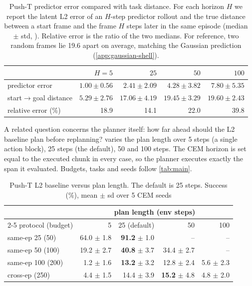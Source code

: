 \documentclass{article} %
\begin{document}
\begin{table}[h]
\centering\small
\caption{Push-T predictor error compared with task distance. For each horizon $H$ we report
the latent L2 error of an $H$-step predictor rollout and the true distance between a start frame
and the frame $H$ steps later in the same episode (median $\pm$ std, ). Relative error is the ratio of the two medians. For reference, two
random frames lie 19.6 apart on average, matching the Gaussian prediction
 (\cref{app:gaussian-shell}).}
\label{tab:predictor-error-and-task-distance}
\begin{tabular}{lrrrr}
\toprule
& $H=5$ & $25$ & $50$ & $100$ \\
\midrule
predictor error         & $1.00\pm0.56$ & $2.41\pm2.09$ & $4.28\pm3.82$ & $7.80\pm5.35$ \\
start$\to$goal distance & $5.29\pm2.76$ & $17.06\pm4.19$ & $19.45\pm3.29$ & $19.60\pm2.43$ \\
relative error (\%)     & 18.9 & 14.1 & 22.0 & 39.8 \\
\bottomrule
\end{tabular}
\end{table}


A related question concerns the planner itself: how far ahead should the L2 baseline plan
before replanning?  varies the plan length over 5 steps (a
single action block), 25 steps (the default), 50 and 100 steps. The CEM horizon is set equal to
the executed chunk in every case, so the planner executes exactly the span it evaluated. Budgets,
tasks and seeds follow \cref{tab:main}.

\begin{table}[h]
\centering\small
\caption{Push-T L2 baseline versus plan length. The default is 25 steps. Success (\%), mean $\pm$ sd over 5 CEM seeds}
\label{tab:replan-frequency-appendix}
\begin{tabular}{lrrrr}
\toprule
& \multicolumn{4}{c}{plan length (env steps)} \\
\cmidrule(lr){2-5}
protocol (budget) & 5 & 25 (default) & 50 & 100 \\
\midrule
same-ep 25 (50)   & 64.0 $\pm$ 1.8 & \textbf{91.2} $\pm$ 1.0 & -- & -- \\
same-ep 50 (100)  & 19.2 $\pm$ 2.7 & \textbf{40.8} $\pm$ 3.7 & 34.4 $\pm$ 2.7 & -- \\
same-ep 100 (200) & 1.2 $\pm$ 1.6  & \textbf{13.2} $\pm$ 3.2 & 12.8 $\pm$ 2.4 & 5.6 $\pm$ 2.3 \\
cross-ep (250)    & 4.4 $\pm$ 1.5  & 14.4 $\pm$ 3.9 & \textbf{15.2} $\pm$ 4.8 & 4.8 $\pm$ 2.0 \\
\bottomrule
\end{tabular}
\end{table}
\end{document}
